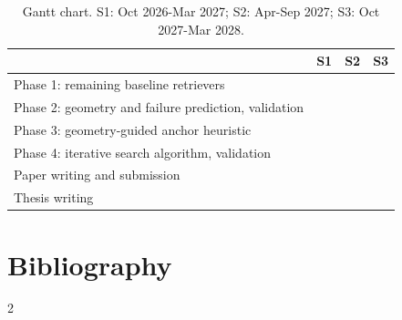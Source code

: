 \documentclass[12pt,a4paper]{article}
\begin{document}
\begin{table}[H]
\centering\small
\caption{Gantt chart. S1: Oct 2026-Mar 2027; S2: Apr-Sep 2027; S3: Oct 2027-Mar 2028.}
\setlength{\arrayrulewidth}{0.4pt}
\begin{tabular}{p{9.6cm}|p{1.4cm}|p{1.4cm}|p{1.4cm}|}
\toprule
 & \centering S1 & \centering S2 & \centering\arraybackslash S3 \\
\midrule
Phase 1: remaining baseline retrievers                   & \cellcolor{bgunavy!55} &   &   \\
Phase 2: geometry and failure prediction, validation     & \cellcolor{bgunavy!55} &   &   \\
Phase 3: geometry-guided anchor heuristic                & \cellcolor{bgunavy!55} & \cellcolor{bgunavy!55} &   \\
Phase 4: iterative search algorithm, validation          &   & \cellcolor{bgunavy!55} & \cellcolor{bgunavy!55} \\
Paper writing and submission                             &   & \cellcolor{bgunavy!25} & \cellcolor{bgunavy!25} \\
Thesis writing                                           &   &   & \cellcolor{bgunavy!25} \\
\bottomrule
\end{tabular}
\end{table}

\section*{Bibliography}
\renewcommand{\bibsection}{}
\begin{multicols}{2}
\footnotesize{}\setlength{\bibsep}{1.5pt}


\end{multicols}
\end{document}

